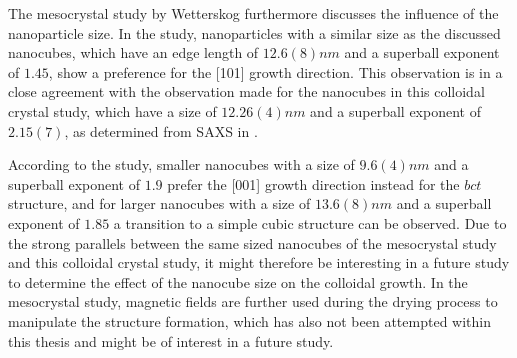 \documentclass[\main/dresen_thesis.tex]{subfiles}
\begin{document}
  The mesocrystal study by Wetterskog \etal \cite{Wetterskog_2016_Tunin} furthermore discusses the influence of the nanoparticle size.
  In the study, nanoparticles with a similar size as the discussed nanocubes, which have an edge length of $12.6(8) \unit{nm}$ and a superball exponent of $1.45$, show a preference for the [101] growth direction.
  This observation is in a close agreement with the observation made for the nanocubes in this colloidal crystal study, which have a size of $12.26(4) \unit{nm}$ and a superball exponent of $2.15(7)$, as determined from SAXS in .

  According to the study, smaller nanocubes with a size of $9.6(4) \unit{nm}$ and a superball exponent of $1.9$ prefer the [001] growth direction instead for the $bct$ structure, and for larger nanocubes with a size of $13.6(8) \unit{nm}$ and a superball exponent of $1.85$ a transition to a simple cubic structure can be observed.
  Due to the strong parallels between the same sized nanocubes of the mesocrystal study and this colloidal crystal study, it might therefore be interesting in a future study to determine the effect of the nanocube size on the colloidal growth.
  In the mesocrystal study, magnetic fields are further used during the drying process to manipulate the structure formation, which has also not been attempted within this thesis and might be of interest in a future study.
\end{document}
